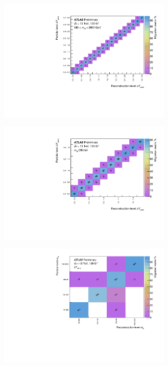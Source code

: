 \begin{figure}[htb]
  \begin{subfigure}{.49\textwidth}\centering\includegraphics[width = 0.95\textwidth]{Figures/m4l/UnfoldingStudies/v014_matrices/deltaYPairs_m4l180-2000Matrix.pdf}\end{subfigure}
 \begin{subfigure}{.49\textwidth}\centering\includegraphics[width = 0.95\textwidth]{Figures/m4l/UnfoldingStudies/v014_matrices/deltaYPairs_m4loffshellMatrix.pdf}\end{subfigure}
  \begin{subfigure}{.49\textwidth}\centering\includegraphics[width = 0.95\textwidth]{Figures/m4l/UnfoldingStudies/v014_matrices/deltaYPairs_m4lMatrix.pdf}\end{subfigure}

\end{figure}
